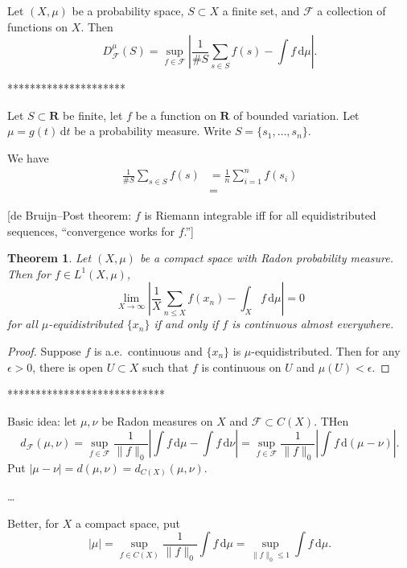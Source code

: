 \documentclass{article}
\newcommand{\bR}{\mathbf{R}}
\newcommand{\cF}{\mathcal{F}}
\newcommand{\dd}{\mathrm{d}}
\newtheorem{theorem}{Theorem}
\numberwithin{theorem}{section}
\begin{document}
Let $(X,\mu)$ be a probability space, $S\subset X$ a finite set, and 
$\cF$ a collection of functions on $X$. Then 
\[
	D_\cF^\mu(S) = \sup_{f\in \cF} \left|\frac{1}{\# S} \sum_{s\in S} f(s) - \int f \, \dd \mu \right| .
\]


*********************

Let $S\subset \bR$ be finite, let $f$ be a function on $\bR$ of bounded 
variation. Let $\mu=g(t)\, \dd t$ be a probability measure. Write 
$S=\{s_1,\dots,s_n\}$. 

We have 
\begin{align*}
	\frac{1}{\# S} \sum_{s\in S} f(s) 
		&= \frac{1}{n} \sum_{i=1}^n f(s_i) \\
		&= 
\end{align*}

[de Bruijn--Post theorem: $f$ is Riemann integrable iff for all 
equidistributed sequences, ``convergence works for $f$.'']

\begin{theorem}
Let $(X,\mu)$ be a compact space with Radon probability measure. Then for 
$f\in L^1(X,\mu)$, 
\[
	\lim_{X\to \infty} \left| \frac{1}{X} \sum_{n\leqslant X} f(x_n) - \int_X f\, \dd \mu\right| = 0
\]
for all $\mu$-equidistributed $\{x_n\}$ if and only if $f$ is continuous 
almost everywhere. 
\end{theorem}
\begin{proof}
Suppose $f$ is a.e.~continuous and $\{x_n\}$ is $\mu$-equidistributed. 
Then for any $\epsilon>0$, there is open $U\subset X$ such that $f$ is 
continuous on $U$ and $\mu(U)<\epsilon$. 
\end{proof}

****************************

Basic idea: let $\mu,\nu$ be Radon measures on $X$ and $\cF\subset C(X)$. THen 
\[
	d_\cF(\mu,\nu) = \sup_{f\in \cF} \frac{1}{\|f\|_0}\left| \int f\, \dd \mu - \int f \, \dd \nu\right| = \sup_{f\in \cF} \frac{1}{\|f\|_0}\left| \int f\, \dd (\mu-\nu)\right| .
\]
Put $|\mu-\nu| = d(\mu,\nu)=d_{C(X)}(\mu,\nu)$. 

\ldots

Better, for $X$ a compact space, put 
\[
	|\mu| = \sup_{f\in C(X)} \frac{1}{\|f\|_0} \int f\, \dd \mu = \sup_{\|f\|_0\leqslant 1} \int f\, \dd \mu .
\]
\end{document}
